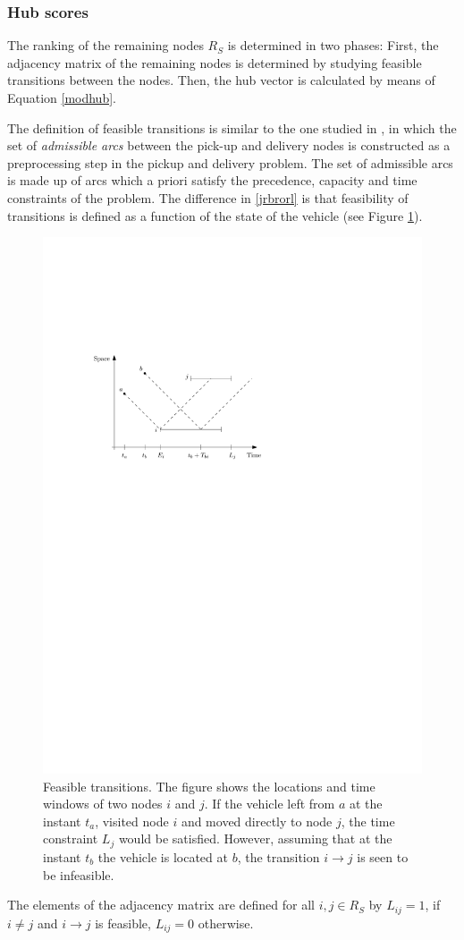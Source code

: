 \documentclass[dissertation,draft*]{aaltoseries}
\begin{document}
\subsubsection{Hub scores}
\label{feasibility}
The ranking of the remaining nodes $R_S$ is determined in two phases: 
First, the adjacency matrix of the remaining nodes is determined by studying 
feasible transitions between the nodes.
Then, the hub vector is calculated by means of Equation \eqref{modhub}.

The definition of feasible transitions is similar to the one studied in \cite{dumas03}, 
in which the set of \emph{admissible arcs} between the pick-up and delivery nodes is constructed
as a preprocessing step in the pickup and delivery problem. The set of admissible arcs is 
made up of arcs which a priori satisfy the precedence, capacity and time constraints of the problem.
The difference in \ref{jrbrorl} is that feasibility of 
transitions is defined as a function of the state of the vehicle (see Figure \ref{transitions01}).

\begin{figure}[ht]
\begin{center}
\includegraphics[width=0.7\columnwidth]{transitions01.pdf}
\caption{Feasible transitions. The figure shows the 
locations and time windows of two nodes $i$ and $j$.
If the vehicle left from $a$ at the instant $t_a$, visited node $i$
and moved directly to node $j$, the time constraint $L_j$ would be satisfied. 
However, assuming that at the instant $t_b$ the vehicle is located at $b$, the
transition $i \to j$ is seen to be infeasible.
}
\label{transitions01}
\end{center}
\end{figure}
The elements of the adjacency matrix are defined for all $i,j \in R_S$ by 
$L_{ij}= 1$, if $i \neq j$ and $i \to j$ is feasible, $L_{ij} = 0$ otherwise.
\end{document}
